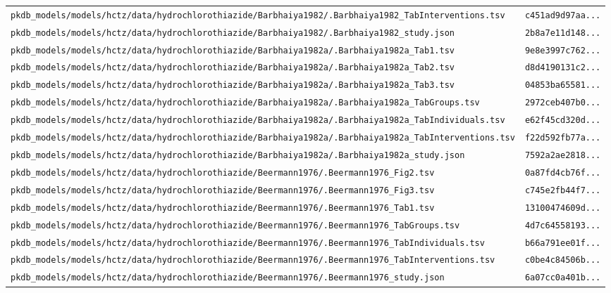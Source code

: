 \begin{longtable}{ll}
\texttt{pkdb\_models/models/hctz/data/hydrochlorothiazide/Barbhaiya1982/.Barbhaiya1982\_TabInterventions.tsv} & \texttt{c451ad9d97aa...} \\
\texttt{pkdb\_models/models/hctz/data/hydrochlorothiazide/Barbhaiya1982/.Barbhaiya1982\_study.json} & \texttt{2b8a7e11d148...} \\
\texttt{pkdb\_models/models/hctz/data/hydrochlorothiazide/Barbhaiya1982a/.Barbhaiya1982a\_Tab1.tsv} & \texttt{9e8e3997c762...} \\
\texttt{pkdb\_models/models/hctz/data/hydrochlorothiazide/Barbhaiya1982a/.Barbhaiya1982a\_Tab2.tsv} & \texttt{d8d4190131c2...} \\
\texttt{pkdb\_models/models/hctz/data/hydrochlorothiazide/Barbhaiya1982a/.Barbhaiya1982a\_Tab3.tsv} & \texttt{04853ba65581...} \\
\texttt{pkdb\_models/models/hctz/data/hydrochlorothiazide/Barbhaiya1982a/.Barbhaiya1982a\_TabGroups.tsv} & \texttt{2972ceb407b0...} \\
\texttt{pkdb\_models/models/hctz/data/hydrochlorothiazide/Barbhaiya1982a/.Barbhaiya1982a\_TabIndividuals.tsv} & \texttt{e62f45cd320d...} \\
\texttt{pkdb\_models/models/hctz/data/hydrochlorothiazide/Barbhaiya1982a/.Barbhaiya1982a\_TabInterventions.tsv} & \texttt{f22d592fb77a...} \\
\texttt{pkdb\_models/models/hctz/data/hydrochlorothiazide/Barbhaiya1982a/.Barbhaiya1982a\_study.json} & \texttt{7592a2ae2818...} \\
\texttt{pkdb\_models/models/hctz/data/hydrochlorothiazide/Beermann1976/.Beermann1976\_Fig2.tsv} & \texttt{0a87fd4cb76f...} \\
\texttt{pkdb\_models/models/hctz/data/hydrochlorothiazide/Beermann1976/.Beermann1976\_Fig3.tsv} & \texttt{c745e2fb44f7...} \\
\texttt{pkdb\_models/models/hctz/data/hydrochlorothiazide/Beermann1976/.Beermann1976\_Tab1.tsv} & \texttt{13100474609d...} \\
\texttt{pkdb\_models/models/hctz/data/hydrochlorothiazide/Beermann1976/.Beermann1976\_TabGroups.tsv} & \texttt{4d7c64558193...} \\
\texttt{pkdb\_models/models/hctz/data/hydrochlorothiazide/Beermann1976/.Beermann1976\_TabIndividuals.tsv} & \texttt{b66a791ee01f...} \\
\texttt{pkdb\_models/models/hctz/data/hydrochlorothiazide/Beermann1976/.Beermann1976\_TabInterventions.tsv} & \texttt{c0be4c84506b...} \\
\texttt{pkdb\_models/models/hctz/data/hydrochlorothiazide/Beermann1976/.Beermann1976\_study.json} & \texttt{6a07cc0a401b...} \\

\end{longtable}
